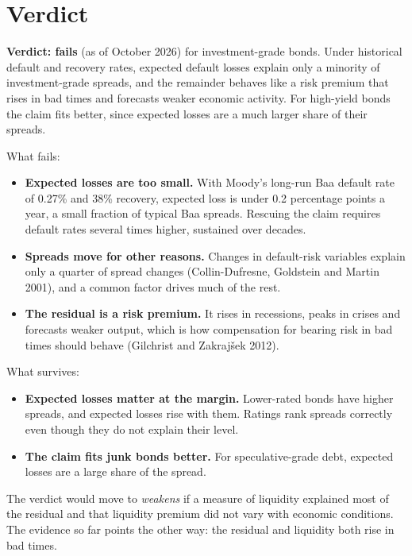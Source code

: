 \section{Verdict}
\label{sec:18-verdict}

\begin{callout}
\textbf{Verdict: fails} (as of October 2026) for investment-grade bonds. Under historical default and recovery rates, expected default losses explain only a minority of investment-grade spreads, and the remainder behaves like a risk premium that rises in bad times and forecasts weaker economic activity. For high-yield bonds the claim fits better, since expected losses are a much larger share of their spreads.
\end{callout}

What fails:

\begin{itemize}
  \item \textbf{Expected losses are too small.} With Moody's long-run Baa default rate of 0.27\% and 38\% recovery, expected loss is under 0.2 percentage points a year, a small fraction of typical Baa spreads. Rescuing the claim requires default rates several times higher, sustained over decades.
  \item \textbf{Spreads move for other reasons.} Changes in default-risk variables explain only a quarter of spread changes (Collin-Dufresne, Goldstein and Martin 2001), and a common factor drives much of the rest.
  \item \textbf{The residual is a risk premium.} It rises in recessions, peaks in crises and forecasts weaker output, which is how compensation for bearing risk in bad times should behave (Gilchrist and Zakraj\v{s}ek 2012).
\end{itemize}

What survives:

\begin{itemize}
  \item \textbf{Expected losses matter at the margin.} Lower-rated bonds have higher spreads, and expected losses rise with them. Ratings rank spreads correctly even though they do not explain their level.
  \item \textbf{The claim fits junk bonds better.} For speculative-grade debt, expected losses are a large share of the spread.
\end{itemize}

The verdict would move to \emph{weakens} if a measure of liquidity explained most of the residual and that liquidity premium did not vary with economic conditions. The evidence so far points the other way: the residual and liquidity both rise in bad times.

